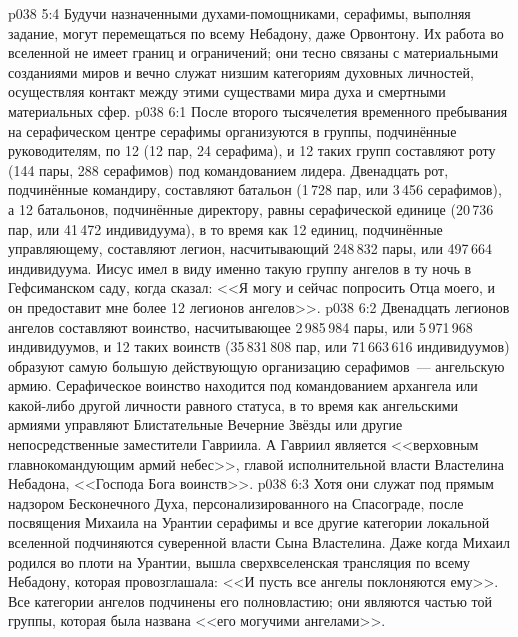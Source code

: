 \vs p038 5:4 Будучи назначенными духами\hyp{}помощниками, серафимы, выполняя задание, могут перемещаться по всему Небадону, даже Орвонтону. Их работа во вселенной не имеет границ и ограничений; они тесно связаны с материальными созданиями миров и вечно служат низшим категориям духовных личностей, осуществляя контакт между этими существами мира духа и смертными материальных сфер.
\vs p038 6:1 После второго тысячелетия временного пребывания на серафическом центре серафимы организуются в группы, подчинённые руководителям, по 12 (12 пар, 24 серафима), и 12 таких групп составляют роту (144 пары, 288 серафимов) под командованием лидера. Двенадцать рот, подчинённые командиру, составляют батальон (1\,728 пар, или 3\,456 серафимов), а 12 батальонов, подчинённые директору, равны серафической единице (20\,736 пар, или 41\,472 индивидуума), в то время как 12 единиц, подчинённые управляющему, составляют легион, насчитывающий 248\,832 пары, или 497\,664 индивидуума. Иисус имел в виду именно такую группу ангелов в ту ночь в Гефсиманском саду, когда сказал: <<Я могу и сейчас попросить Отца моего, и он предоставит мне более 12 легионов ангелов>>.
\vs p038 6:2 Двенадцать легионов ангелов составляют воинство, насчитывающее 2\,985\,984 пары, или 5\,971\,968 индивидуумов, и 12 таких воинств (35\,831\,808 пар, или 71\,663\,616 индивидуумов) образуют самую большую действующую организацию серафимов~--- ангельскую армию. Серафическое воинство находится под командованием архангела или какой\hyp{}либо другой личности равного статуса, в то время как ангельскими армиями управляют Блистательные Вечерние Звёзды или другие непосредственные заместители Гавриила. А Гавриил является <<верховным главнокомандующим армий небес>>, главой исполнительной власти Властелина Небадона, <<Господа Бога воинств>>.
\vs p038 6:3 Хотя они служат под прямым надзором Бесконечного Духа, персонализированного на Спасограде, после посвящения Михаила на Урантии серафимы и все другие категории локальной вселенной подчиняются суверенной власти Сына Властелина. Даже когда Михаил родился во плоти на Урантии, вышла сверхвселенская трансляция по всему Небадону, которая провозглашала: <<И пусть все ангелы поклоняются ему>>. Все категории ангелов подчинены его полновластию; они являются частью той группы, которая была названа <<его могучими ангелами>>.
